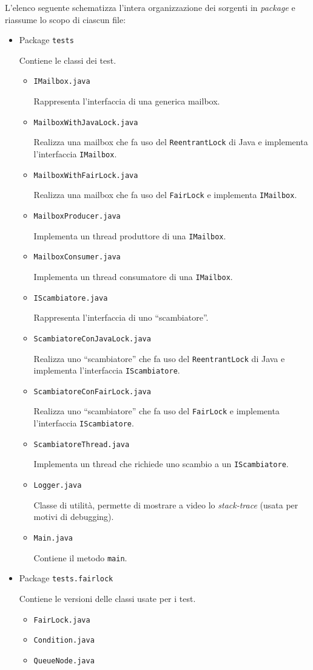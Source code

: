 \documentclass[a4paper,twoside]{article}
\newcommand*\file{\texttt}
\newcommand\code{\lstinline[basicstyle=\normalsize\ttfamily]}
\begin{document}
L'elenco seguente schematizza l'intera organizzazione dei sorgenti in \emph{package} e riassume lo scopo di ciascun file:
%
\begin{itemize}
\item Package \file{tests}\par
Contiene le classi dei test.
\begin{itemize}
\item \file{IMailbox.java}\par
Rappresenta l'interfaccia di una generica mailbox.
\item \file{MailboxWithJavaLock.java}\par
Realizza una mailbox che fa uso del \code|ReentrantLock| di Java e implementa l'interfaccia \code|IMailbox|.
\item \file{MailboxWithFairLock.java}\par
Realizza una mailbox che fa uso del \code|FairLock| e implementa \code|IMailbox|.
\item \file{MailboxProducer.java}\par
Implementa un thread produttore di una \code|IMailbox|.
\item \file{MailboxConsumer.java}\par
Implementa un thread consumatore di una \code|IMailbox|.
\item \file{IScambiatore.java}\par
Rappresenta l'interfaccia di uno “scambiatore”.
\item \file{ScambiatoreConJavaLock.java}\par
Realizza uno “scambiatore” che fa uso del \code|ReentrantLock| di Java e implementa l'interfaccia \code|IScambiatore|.
\item \file{ScambiatoreConFairLock.java}\par
Realizza uno “scambiatore” che fa uso del \code|FairLock| e implementa l'interfaccia \code|IScambiatore|.
\item \file{ScambiatoreThread.java}\par
Implementa un thread che richiede uno scambio a un \code|IScambiatore|.
\item \file{Logger.java}\par
Classe di utilità, permette di mostrare a video lo \emph{stack-trace} (usata per motivi di debugging).
\item \file{Main.java}\par
Contiene il metodo \code|main|.
\end{itemize}

\item Package \file{tests.fairlock}\par
Contiene le versioni delle classi usate per i test.
\begin{itemize}
\item \file{FairLock.java}
\item \file{Condition.java}
\item \file{QueueNode.java}
\end{itemize}
\end{itemize}
\end{document}
